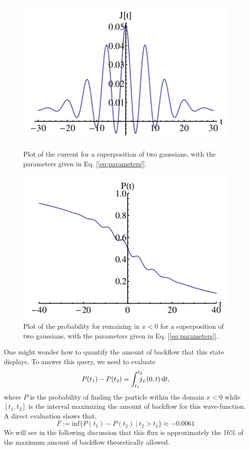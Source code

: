 \begin{figure}[h]	
\centering
\begin{minipage}{0.45\textwidth}
		\includegraphics[scale=0.43]{images/gaussian_1}
		\caption{Plot of the current for a superposition of
			two gaussians, with the parameters given in Eq. [\ref{eq:parameters}].}
		\label{fig:back}
\end{minipage}
\hfil
\begin{minipage}{0.45\textwidth}
		\includegraphics[scale=0.43]{images/gaussian_2}
		\caption{Plot of the probability for
			remaining in $x < 0$ for a superposition of two gaussians,
			with the parameters given in Eq. [\ref{eq:parameters}]. }
		\label{fig:back_2}
\end{minipage}
\end{figure}
One might wonder how to quantify the amount of backflow that this state displays. To answer this query, we need to evaluate
\begin{equation}
	P(t_1)-P(t_2)=\int_{t_1}^{t_2}\!\!\!\!j_\psi(0,t)\, \mathrm d t,
	\label{eq:prob_flux}
\end{equation} 
where $P$ is the probability of finding the particle within the domain $x<0$ while $[t_1 , t_2 ]$ is the interval maximizing the amount of backflow for this wave-function. A direct evaluation shows that,
\begin{equation}
	F:=\mathrm{inf}\{P(t_1)-P(t_2)\ |\ t_2>t_1 \}\approx -0.0061
\end{equation}
We will see in the following discussion that this flux is approximately the 16\% of the maximum amount of backflow theoretically allowed. 
